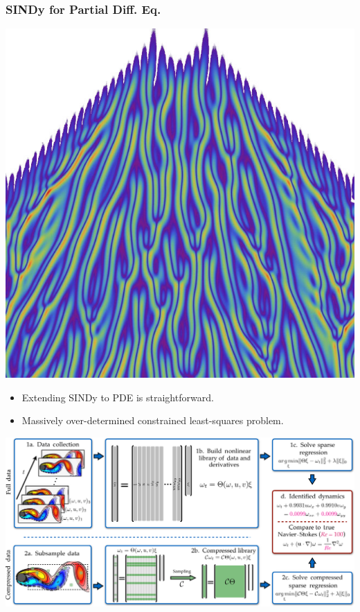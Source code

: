 \documentclass[aspectratio=169,compress,12pt,dvipsnames]{beamer}
\begin{document}
\begin{frame}
    \frametitle{SINDy for Partial Diff. Eq.}
    \vfill
    \begin{minipage}{.28\textwidth}
        \centering
        \includegraphics[width=\textwidth]{imgs/kuramoto.png}
    \end{minipage}%
    \hfill
    \begin{minipage}{.68\textwidth}
        \begin{itemize}
            \item Extending SINDy to PDE is straightforward.
            \par\bigskip
            \item Massively over-determined constrained least-squares problem.
        \end{itemize}
    \end{minipage}
    \vfill
\end{frame}

\begin{frame}
    \vfill
    \centering
    \includegraphics[width=\textwidth]{imgs/pde_find.png}
    \vfill
\end{frame}
\end{document}
